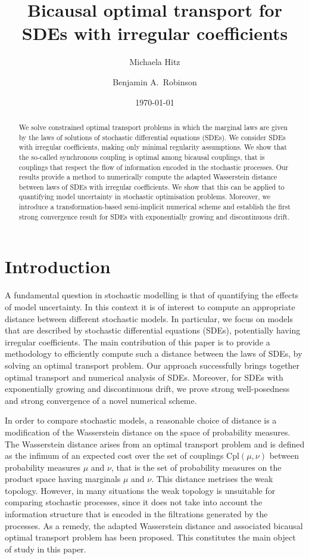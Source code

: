 \documentclass[onseside, final]{amsart}
\author{Michaela Hitz \and Benjamin A.\ Robinson}
\title{Bicausal optimal transport for SDEs with irregular coefficients}
\date{\today}
\theoremstyle{definition}
\newcommand{\cpl}{\mathrm{Cpl}}
\numberwithin{equation}{section}
\begin{document}
\begin{abstract}
	We solve constrained optimal transport problems in which the marginal laws are given by the laws of solutions of stochastic differential equations (SDEs). We consider SDEs with irregular coefficients, making only minimal regularity assumptions. We show that the so-called synchronous coupling is optimal among bicausal couplings, that is couplings that respect the flow of information encoded in the stochastic processes. Our results provide a method to numerically compute the adapted Wasserstein distance between laws of SDEs with irregular coefficients. We show that this can be applied to quantifying model uncertainty in stochastic optimisation problems. Moreover, we introduce a transformation-based semi-implicit numerical scheme and establish the first strong convergence result for SDEs with exponentially growing and discontinuous drift.
\end{abstract}
\maketitle

\section{Introduction}\label{sec:intro}
	A fundamental question in stochastic modelling is that of quantifying the effects of model uncertainty. In this context it is of interest to compute an appropriate distance between different stochastic models. In particular, we focus on models that are described by stochastic differential equations (SDEs), potentially having irregular coefficients.
	The main contribution of this paper is to provide a methodology to efficiently compute such a distance between the laws of SDEs, by solving an optimal transport problem. Our approach successfully brings together optimal transport and numerical analysis of SDEs. Moreover, for SDEs with exponentially growing and discontinuous drift, we prove strong well-posedness and strong convergence of a novel numerical scheme.

	In order to compare stochastic models, a reasonable choice of distance is a modification of the Wasserstein distance on the space of probability measures. The Wasserstein distance arises from an optimal transport problem and is defined as the infimum of an expected cost over the set of couplings $\cpl(\mu, \nu)$ between probability measures $\mu$ and $\nu$, that is the set of probability measures on the product space having marginals $\mu$ and $\nu$. This distance metrises the weak topology. However, in many situations the weak topology is unsuitable for comparing stochastic processes, since it does not take into account the information structure that is encoded in the filtrations generated by the processes. As a remedy, the adapted Wasserstein distance and associated bicausal optimal transport problem has been proposed. This constitutes the main object of study in this paper.
		
\end{document}
